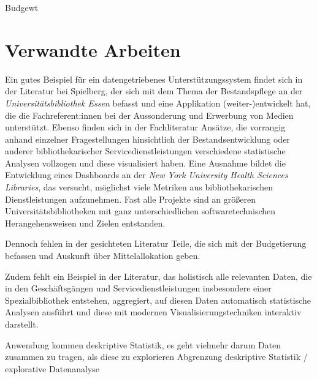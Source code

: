 Budgewt





\section{Verwandte Arbeiten}


Ein gutes Beispiel für ein datengetriebenes Unterstützungssystem findet sich in
der Literatur bei Spielberg, der sich mit dem Thema der Bestandspflege an der
\textit{Universitätsbibliothek Essen} befasst und eine Applikation (weiter-)entwickelt hat, die
die Fachreferent:innen bei der Aussonderung und Erwerbung von Medien
unterstützt.\cite{spielberg_eike_t_fachref-assistent_nodate}
Ebenso finden sich in der Fachliteratur Ansätze, die vorrangig anhand einzelner
Fragestellungen hinsichtlich der Bestandsentwicklung\cite{hughes_long-term_2016} oder anderer
bibliothekarischer Servicedienstleistungen\cite{kutlay_shiny_2020, knievel_use_2006,meyer_using_2018} verschiedene statistische Analysen
vollzogen und diese visualisiert haben.
Eine Ausnahme bildet die Entwicklung eines Dashboards an der \textit{New York
University Health Sciences Libraries}, das versucht, möglichst viele Metriken
aus bibliothekarischen Dienstleistungen aufzunehmen.\cite{morton-owens_trends_2012}
Fast alle Projekte sind an größeren
Universitätsbibliotheken mit ganz unterschiedlichen softwaretechnischen
Herangehensweisen\cite{finch_using_2016, wiegand_visualizing_2013} und Zielen\cite{phetteplace_effectively_2012} entstanden.

Dennoch fehlen in der gesichteten Literatur Teile, die sich mit der Budgetierung
befassen und Auskunft über Mittelallokation geben.

Zudem fehlt ein Beispiel in der Literatur, das holistisch alle relevanten Daten, die in den
Geschäftsgängen und Servicedienstleistungen insbesondere einer Spezialbibliothek entstehen,
aggregiert, auf diesen Daten automatisch statistische Analysen ausführt und diese mit modernen Visualisierungstechniken
interaktiv darstellt.

Anwendung kommen deskriptive Statistik, es geht vielmehr darum Daten zusammen zu tragen, als diese zu explorieren 
Abgrenzung deskriptive Statistik / explorative Datenanalyse

